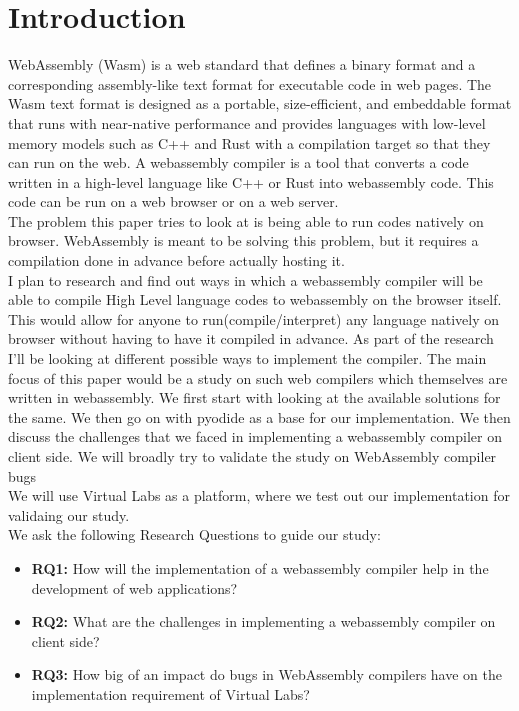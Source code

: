 \section{Introduction}
WebAssembly (Wasm)\cite{wasm} is a web standard that defines a binary format and a corresponding assembly-like text format for executable code in web pages. The Wasm text format is designed as a portable, size-efficient, and embeddable format that runs with near-native performance and provides languages with low-level memory models such as C++ and Rust with a compilation target so that they can run on the web.
A webassembly compiler is a tool that converts a code written in a high-level language like C++ or Rust into webassembly code. This code can be run on a web browser or on a web server. \\
The problem this paper tries to look at is being able to run codes natively on browser. WebAssembly is meant to be solving this problem, but it requires a compilation done in advance before actually hosting it. \\
I plan to research and find out ways in which a webassembly compiler will be able to compile High Level language codes to webassembly on the browser itself. This would allow for anyone to run(compile/interpret) any language natively on browser without having to have it compiled in advance. As part of the research I’ll be looking at different possible ways to implement the compiler.
The main focus of this paper would be a study on such web compilers which themselves are written in webassembly. We first start with looking at the available solutions for the same. We then go on with pyodide as a base for our implementation. We then discuss the challenges that we faced in implementing a webassembly compiler on client side. We will broadly try to validate the study on WebAssembly compiler bugs\cite{bugsinwasm} \\
We will use Virtual Labs as a platform, where we test out our implementation for validaing our study. \\
We ask the following Research Questions to guide our study:
\begin{itemize}
    \item \textbf{RQ1:} How will the implementation of a webassembly compiler help in the development of web applications?
    \item \textbf{RQ2:} What are the challenges in implementing a webassembly compiler on client side?
    \item \textbf{RQ3:} How big of an impact do bugs in WebAssembly compilers have on the implementation requirement of Virtual Labs?
\end{itemize}
